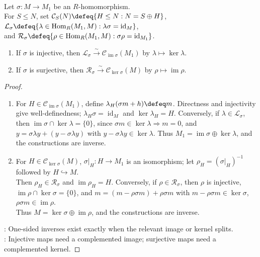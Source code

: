 \begin{theorem} \label{thm:module-one-sided-inverses-and-complements} \\
Let $\sigma:M\to M_1$ be an $R$-homomorphism.\\
For $S\leq N$, set $\mathcal{C}_S(N)\defeq\{H\leq N:N=S\oplus H\}$, $\mathcal{L}_\sigma\defeq\{\lambda\in\operatorname{Hom}_R(M_1,M):\lambda\sigma=\operatorname{id}_M\}$,\\
and $\mathcal{R}_\sigma\defeq\{\rho\in\operatorname{Hom}_R(M_1,M):\sigma\rho=\operatorname{id}_{M_1}\}$.
\begin{enumerate}[label=(\roman*)]
\setlength{\itemsep}{0pt}
\item If $\sigma$ is injective, then $\mathcal{L}_\sigma\xrightarrow{\sim}\mathcal{C}_{\operatorname{im}\sigma}(M_1)$ by $\lambda\mapsto\ker\lambda$.
\item If $\sigma$ is surjective, then $\mathcal{R}_\sigma\xrightarrow{\sim}\mathcal{C}_{\ker\sigma}(M)$ by $\rho\mapsto\operatorname{im}\rho$.
\end{enumerate}
\begin{proof}
\begin{enumerate}[label=(\roman*)]
\setlength{\itemsep}{0pt}
\item For $H\in\mathcal{C}_{\operatorname{im}\sigma}(M_1)$, define $\lambda_H(\sigma m+h)\defeq m$. Directness and injectivity give well-definedness; $\lambda_H\sigma=\operatorname{id}_M$ and $\ker\lambda_H=H$. Conversely, if $\lambda\in\mathcal{L}_\sigma$, then $\operatorname{im}\sigma\cap\ker\lambda=\{0\}$, since $\sigma m\in\ker\lambda\Rightarrow m=0$, and $y=\sigma\lambda y+(y-\sigma\lambda y)$ with $y-\sigma\lambda y\in\ker\lambda$. Thus $M_1=\operatorname{im}\sigma\oplus\ker\lambda$, and the constructions are inverse.
\item For $H\in\mathcal{C}_{\ker\sigma}(M)$, $\sigma|_H:H\to M_1$ is an isomorphism; let $\rho_H=(\sigma|_H)^{-1}$ followed by $H\hookrightarrow M$.\\
Then $\rho_H\in\mathcal{R}_\sigma$ and $\operatorname{im}\rho_H=H$. Conversely, if $\rho\in\mathcal{R}_\sigma$, then $\rho$ is injective, $\operatorname{im}\rho\cap\ker\sigma=\{0\}$, and $m=(m-\rho\sigma m)+\rho\sigma m$ with $m-\rho\sigma m\in\ker\sigma$, $\rho\sigma m\in\operatorname{im}\rho$.\\
Thus $M=\ker\sigma\oplus\operatorname{im}\rho$, and the constructions are inverse.
\end{enumerate}
: One-sided inverses exist exactly when the relevant image or kernel splits.\\
: Injective maps need a complemented image; surjective maps need a complemented kernel.
\end{proof}
\end{theorem}

